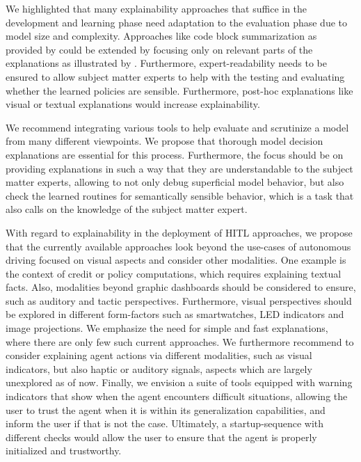 \documentclass[twoside,11pt]{article}
\begin{document}
We highlighted that many explainability approaches that suffice in the development and learning phase need adaptation to the evaluation phase due to model size and complexity. Approaches like code block summarization as provided by \citet{VermaEtAl:2018:ProgrammaticallyInterpretableRL} could be extended by focusing only on relevant parts of the explanations as illustrated by \citet{Vu:2020:PGMExplainer}. Furthermore, expert-readability needs to be ensured to allow subject matter experts to help with the testing and evaluating whether the learned policies are sensible.
Furthermore, post-hoc explanations like visual \citep{DBLP:journals/corr/abs-1912-12191,DBLP:journals/corr/abs-1912-05743} or textual \citep{fukuchi2017autonomous,HayesShah:2017:AutonomousPolicyExplanation} explanations would increase explainability.

We recommend integrating various tools to help evaluate and scrutinize a model from many different viewpoints. We propose that thorough model decision explanations are essential for this process. Furthermore, the focus should be on providing explanations in such a way that they are understandable to the subject matter experts, allowing to not only debug superficial model behavior, but also check the learned routines for semantically sensible behavior, which is a task that also calls on the knowledge of the subject matter expert.


With regard to explainability in the deployment of HITL approaches, we propose that the currently available approaches look beyond the use-cases of autonomous driving focused on visual aspects and consider other modalities. One example is the context of credit or policy computations, which requires explaining textual facts. Also, modalities beyond graphic dashboards should be considered to ensure, such as auditory and tactic perspectives. Furthermore, visual perspectives should be explored in different form-factors such as smartwatches, LED indicators and image projections.
We emphasize the need for simple and fast explanations, where there are only few such current approaches. We furthermore recommend to consider explaining agent actions via different modalities, such as visual indicators, but also haptic or auditory signals, aspects which are largely unexplored as of now. Finally, we envision a suite of tools equipped with warning indicators that show when the agent encounters difficult situations, allowing the user to trust the agent when it is within its generalization capabilities, and inform the user if that is not the case. Ultimately, a startup-sequence with different checks would allow the user to ensure that the agent is properly initialized and trustworthy.
\end{document}
